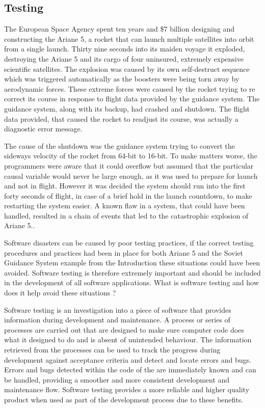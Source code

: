 \documentclass[a4paper,12pt]{article}
\begin{document}
\subsection{Testing}
\par The European Space Agency spent ten years and \$7 billion designing and constructing the Ariane 5, a rocket that can launch multiple satellites into orbit from a single launch. Thirty nine seconds into its maiden voyage it exploded, destroying the Ariane 5 and its cargo of four uninsured, extremely expensive scientific satellites. The explosion was caused by its own self-destruct sequence which was triggered automatically as the boosters were being torn away by aerodynamic forces. These extreme forces were caused by the rocket trying to re correct its course in response to flight data provided by the guidance system. The guidance system, along with its backup, had crashed and shutdown. The flight data provided, that caused the rocket to readjust its course, was actually a diagnostic error message. 
\vspace{3mm}
\par The cause of the shutdown was the guidance system trying to convert the sideways velocity of the rocket from 64-bit to 16-bit. To make matters worse, the programmers were aware that it could overflow but assumed that the particular causal variable would never be large enough, as it was used to prepare for launch and not in flight. However it was decided the system should run into the first forty seconds of flight, in case of a brief hold in the launch countdown, to make restarting the system easier. A known flaw in a system, that could have been handled, resulted in a chain of events that led to the catastrophic explosion of Ariane 5.\cite{Ariane5}.
\vspace{3mm}
\par Software disasters can be caused by poor testing practices\cite{mcquaid2012software}, if the correct testing procedures and practices had been in place for both Ariane 5 and the Soviet Guidance System example from the Introduction these situations could have been avoided. Software testing is therefore extremely important and should be included in the development of all software applications. What is software testing and how does it help avoid these situations ?
\vspace{3mm}
\par Software testing is an investigation into a piece of software that provides information during development and maintenance. A process or series of processes are carried out that are designed to make sure computer code does what it designed to do and is absent of unintended behaviour\cite{myers2011art}. The information retrieved from the processes can be used to track the progress during development against acceptance criteria and detect and locate errors and bugs. Errors and bugs detected within the code of the are immediately known and can be handled, providing a smoother and more consistent development and maintenance flow. Software testing provides a more reliable and higher quality product when used as part of the development process due to these benefits.
\end{document}

